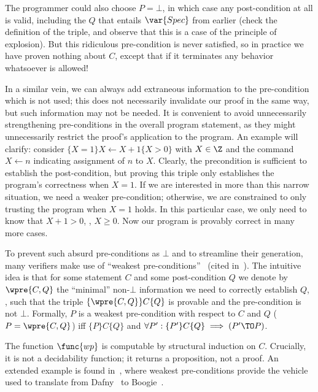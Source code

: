 The programmer could also choose \(P = \bot\), in which case any post-condition
at all is valid, including the \(Q\) that entails \(\var{Spec}\) from earlier
(check the definition of the triple, and observe that this is a case of the
principle of explosion). But this ridiculous pre-condition is never satisfied,
so in practice we have proven nothing about \(C\), except that if it terminates
any behavior whatsoever is allowed!

In a similar vein, we can always add extraneous information to the pre-condition
which is not used; this does not necessarily invalidate our proof in the same
way, but such information may not be needed. It is convenient to avoid
unnecessarily strengthening pre-conditions in the overall program statement, as
they might unnecessarily restrict the proof's application to the program. An
example will clarify: consider \(\{X = 1\}X \gets X + 1\{X > 0\}\) with \(X \in
\Z\) and the command \(X \gets n\) indicating assignment of \(n\) to \(X\).
Clearly, the precondition is sufficient to establish the post-condition, but
proving this triple only establishes the program's correctness when \(X = 1\).
If we are interested in more than this narrow situation, we need a weaker
pre-condition; otherwise, we are constrained to only trusting the program when
\(X = 1\) holds. In this particular case, we only need to know that \(X + 1 >
0\), \ie, \(X \ge 0\). Now our program is provably correct in many more cases.

To prevent such absurd pre-conditions as \(\bot\) and to streamline their
generation, many verifiers make use of ``weakest
pre-conditions''~\cite{dijkstra1976discipline,Nelson_1989} (cited
in~\cite{leino2008specification}). The intuitive idea is that for some statement
\(C\) and some post-condition \(Q\) we denote by \(\wpre{C, Q}\) the ``minimal''
non-\(\bot\) information we need to correctly establish \(Q\), \ie, such that
the triple \(\{\wpre{C,Q}\} C \{Q\}\) is provable and the pre-condition is not
\(\bot\). Formally, \(P\) is a weakest pre-condition with respect to \(C\) and
\(Q\) (\(P = \wpre{C,Q}\)) iff \(\{P\} C \{Q\}\) and \(\forall P': \{P'\} C
\{Q\} \implies (P' \TO P)\).

The function \(\func{wp}\) is computable by structural induction on
\(C\). Crucially, it is not a decidability function; it returns a proposition,
not a proof. An extended example is found in~\cite[\S 3]{leino2008specification},
where weakest pre-conditions provide the vehicle used to translate from
Dafny~\cite{leino2010dafny} to Boogie~\cite{Barnett_2006,leino2008this}.

